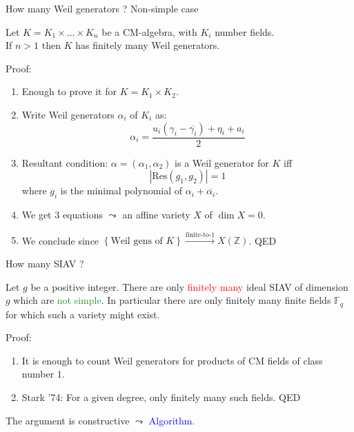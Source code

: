 \documentclass[usenames,dvipsnames,handout]{beamer}
\def\Z{\mathbb{Z}}
\def\F{\mathbb{F}}
\newcommand{\set}[1]{\left\lbrace#1\right\rbrace }
\newcommand{\red}[1]{\textcolor{red}{#1}}
\newcommand{\blue}[1]{\textcolor{blue}{#1}}
\newcommand{\green}[1]{\textcolor{ForestGreen}{#1}}
\begin{document}
\begin{frame}{ How many Weil generators ?  Non-simple case  }
    \begin{theorem}
    Let $K=K_1\times\ldots\times K_n$ be a CM-algebra, with $K_i$ number fields.\\ 
    \pause If $n>1$ then $K$ has finitely many Weil generators.
    \end{theorem}
    \pause Proof:
    \begin{enumerate}
        \item Enough to prove it for $K=K_1\times K_2$.
        \pause \item Write Weil generators $\alpha_i$ of $K_i$ as:
        \[\alpha_i = \frac{u_i(\gamma_i - \overline{\gamma_i}) + \eta_i + a_i}{2}\]
        \pause \item Resultant condition: $\alpha=(\alpha_1,\alpha_2)$ is a Weil generator for $K$ iff
        \[ |\mathrm{Res}(g_1,g_2)|=1 \]
        where $g_i$ is the minimal polynomial of $\alpha_i+\overline{\alpha_i}$.
        \pause \item We get $3$ equations $\leadsto$ an affine variety $X$ of $\dim X=0$.
        \pause \item We conclude since $\set{\text{Weil gens of } K} \xrightarrow{\text{finite-to-}1} X(\Z) $. \qquad QED
    \end{enumerate}
\end{frame}

\begin{frame}{ How many SIAV ?  }
	\begin{corollary}
	Let $g$ be a positive integer.
	There are only \red{finitely many} ideal SIAV of dimension $g$ which are \green{not simple}.
	\pause In particular there are only finitely many finite fields $\F_q$ for which such a variety might exist.
	\end{corollary}
	\pause Proof:
	\begin{enumerate}
	    \item It is enough to count Weil generators for products of CM fields of class number $1$.
	    \pause \item Stark '74: For a given degree, only finitely many such fields. \qquad 	QED
	\end{enumerate}
    \pause
	The argument is constructive $\leadsto$ \blue{Algorithm}.
\end{frame}
\end{document}
